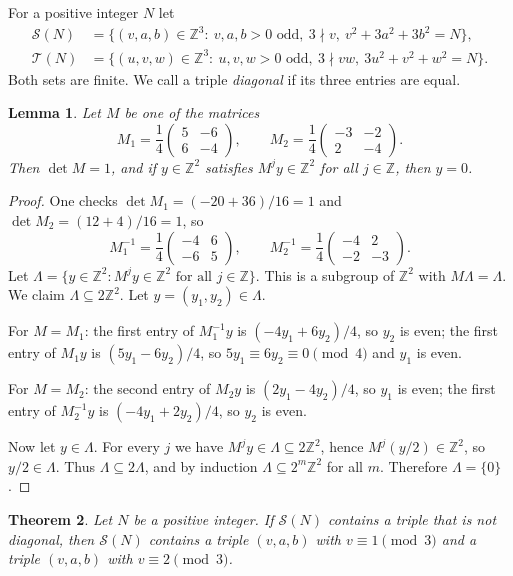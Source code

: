 \documentclass[11pt]{amsart}
\newtheorem{theorem}{Theorem}[section]
\newtheorem{lemma}[theorem]{Lemma}
\theoremstyle{definition}
\theoremstyle{remark}
\newcommand{\Z}{\mathbb{Z}}
\newcommand{\cS}{\mathcal{S}}
\newcommand{\cT}{\mathcal{T}}
\begin{document}
For a positive integer $N$ let
\begin{align*}
\cS(N)&=\{(v,a,b)\in\Z^3:\ v,a,b>0 \text{ odd},\ 3\nmid v,\ v^2+3a^2+3b^2=N\},\\
\cT(N)&=\{(u,v,w)\in\Z^3:\ u,v,w>0 \text{ odd},\ 3\nmid vw,\ 3u^2+v^2+w^2=N\}.
\end{align*}
Both sets are finite. We call a triple \emph{diagonal} if its three entries are equal.

\begin{lemma}\label{lem:2adic}
Let $M$ be one of the matrices
\[
M_1=\frac14\begin{pmatrix}5&-6\\ 6&-4\end{pmatrix},\qquad
M_2=\frac14\begin{pmatrix}-3&-2\\ 2&-4\end{pmatrix}.
\]
Then $\det M=1$, and if $y\in\Z^2$ satisfies $M^jy\in\Z^2$ for all $j\in\Z$, then $y=0$.
\end{lemma}

\begin{proof}
One checks $\det M_1=(-20+36)/16=1$ and $\det M_2=(12+4)/16=1$, so
\[
M_1^{-1}=\frac14\begin{pmatrix}-4&6\\ -6&5\end{pmatrix},\qquad
M_2^{-1}=\frac14\begin{pmatrix}-4&2\\ -2&-3\end{pmatrix}.
\]
Let $\Lambda=\{y\in\Z^2: M^jy\in\Z^2 \text{ for all } j\in\Z\}$. This is a subgroup of $\Z^2$ with $M\Lambda=\Lambda$.
We claim $\Lambda\subseteq 2\Z^2$. Let $y=(y_1,y_2)\in\Lambda$.

For $M=M_1$: the first entry of $M_1^{-1}y$ is $(-4y_1+6y_2)/4$, so $y_2$ is even; the first entry of $M_1y$ is $(5y_1-6y_2)/4$,
so $5y_1\equiv 6y_2\equiv 0\pmod 4$ and $y_1$ is even.

For $M=M_2$: the second entry of $M_2y$ is $(2y_1-4y_2)/4$, so $y_1$ is even; the first entry of $M_2^{-1}y$ is $(-4y_1+2y_2)/4$, so $y_2$ is even.

Now let $y\in\Lambda$. For every $j$ we have $M^jy\in\Lambda\subseteq 2\Z^2$, hence $M^j(y/2)\in\Z^2$, so $y/2\in\Lambda$.
Thus $\Lambda\subseteq 2\Lambda$, and by induction $\Lambda\subseteq 2^m\Z^2$ for all $m$. Therefore $\Lambda=\{0\}$.
\end{proof}

\begin{theorem}\label{thm:A}
Let $N$ be a positive integer. If $\cS(N)$ contains a triple that is not diagonal,
then $\cS(N)$ contains a triple $(v,a,b)$ with $v\equiv 1\pmod 3$ and a triple $(v,a,b)$ with $v\equiv 2\pmod 3$.
\end{theorem}
\end{document}
